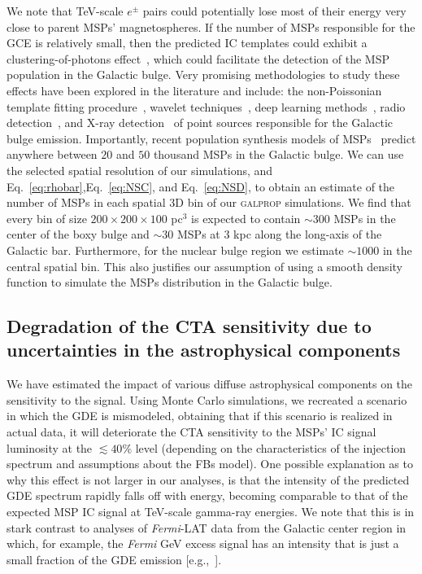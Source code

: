 \documentclass[doublespace,nopageskip]{VTthesis} %
\begin{document}
We note that TeV-scale $e^{\pm}$ pairs could potentially lose most of their energy very close to parent MSPs' magnetospheres. If the number of MSPs responsible for the GCE is relatively small, then the predicted IC templates could exhibit a clustering-of-photons effect~\citep{2021JCAP...01..057A}, which could facilitate the detection of the MSP population in the Galactic bulge.  Very promising methodologies to study these effects have been explored in the literature and include: the non-Poissonian template fitting procedure~\cite{2016PhRvL.116e1103L,2019PhRvL.123x1101L,2020PhRvD.101b3014C,2020PhRvD.102f3019L,2020PhRvL.125l1105L,2020PhRvD.102b3023B}, wavelet techniques~\cite{2016PhRvL.116e1102B,2018PhRvD..98d3009B,2020PhRvL.124w1103Z}, deep learning methods~\citep{2018JCAP...05..058C,2020PhRvL.125x1102L}, radio detection~\citep{2016ApJ...827..143C,2015ApJ...805..172M,2017MNRAS.471..730R,2019ApJ...876...20H}, and X-ray detection~\citep{2021PhRvD.104d3007B} of point sources responsible for the Galactic bulge emission.
%
Importantly, recent population synthesis models of MSPs~\citep{2020JCAP...12..035P} predict anywhere between $20$ and $50$ thousand MSPs in the Galactic bulge. We can use the selected spatial resolution of our simulations, and Eq.~\ref{eq:rhobar},Eq.~\ref{eq:NSC}, and Eq.~\ref{eq:NSD}, to obtain an estimate of the number of MSPs in each spatial 3D bin of our \textsc{galprop} simulations. We find that every bin of size $200\times200\times100$ pc$^3$ is expected to contain $\sim 300$ MSPs in the center of the boxy bulge and $\sim 30$ MSPs at 3 kpc along the long-axis of the Galactic bar. Furthermore, for the nuclear bulge region we estimate $\sim 1000$ in the central spatial bin.  This also justifies our assumption of using a smooth density function to simulate the MSPs distribution in the Galactic bulge. 



\subsection{Degradation of the CTA sensitivity due to uncertainties in the astrophysical components}

 We have estimated the impact of various diffuse astrophysical components on the sensitivity to the signal. Using Monte Carlo simulations, we recreated a scenario in which the GDE is mismodeled, obtaining that if this scenario is realized in actual data, it will deteriorate the CTA sensitivity to the MSPs' IC signal luminosity at the $\lesssim 40\%$ level (depending on the characteristics of the injection spectrum and assumptions about the FBs model). 
 One possible explanation as to why this effect is not larger in our analyses, is that the intensity of the predicted GDE spectrum rapidly falls off with energy, becoming comparable to that of the expected MSP IC signal at TeV-scale gamma-ray energies. We note that this is in stark contrast to analyses of \textit{Fermi}-LAT data from the Galactic center region in which, for example, the \textit{Fermi} GeV excess signal has an intensity that is just a small fraction of the GDE emission [e.g.,~\citet{2020PhRvD.102d3012A}].
\end{document}
